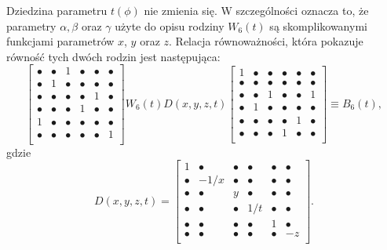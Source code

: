 \documentclass[a4paper,12pt,twoside]{article}
\begin{document}
Dziedzina parametru $t(\phi)$ nie zmienia si\k{e}. W szczeg\'{o}lno\'{s}ci oznacza to, \.{z}e parametry $\alpha, \beta$ oraz $\gamma$ u\.{z}yte do opisu rodziny $W_6(t)$ s\k{a} skomplikowanymi funkcjami parametr\'{o}w $x$, $y$ oraz $z$. Relacja r\'{o}wnowa\.{z}no\'{s}ci, kt\'{o}ra pokazuje r\'{o}wno\'{s}\'{c} tych dw\'{o}ch rodzin jest nast\k{e}puj\k{a}ca:
\begin{equation}
\left[
\begin{array}{cccccc}
\bullet & \bullet &       1 & \bullet & \bullet & \bullet\\
\bullet &       1 & \bullet & \bullet & \bullet & \bullet\\
\bullet & \bullet & \bullet & \bullet &       1 & \bullet\\
\bullet & \bullet & \bullet &       1 & \bullet & \bullet\\
      1 & \bullet & \bullet & \bullet & \bullet & \bullet\\
\bullet & \bullet & \bullet & \bullet & \bullet & 1\\
\end{array}
\right]
W_6(t) D(x,y,z,t)
\left[
\begin{array}{cccccc}
1 & \bullet & \bullet & \bullet & \bullet & \bullet\\
\bullet & \bullet & \bullet & \bullet & \bullet & \bullet\\
\bullet & \bullet &       1 & \bullet & \bullet &       1\\
\bullet &       1 & \bullet & \bullet & \bullet & \bullet\\
\bullet & \bullet & \bullet & \bullet &       1 & \bullet\\
\bullet & \bullet & \bullet &       1 & \bullet & \bullet\\
\end{array}
\right]\equiv B_6(t),
\end{equation}
gdzie
\begin{equation}
D(x,y,z,t)=
\left[
\begin{array}{cccccc}
      1 & \bullet & \bullet & \bullet & \bullet & \bullet\\
\bullet &    -1/x & \bullet & \bullet & \bullet & \bullet\\
\bullet & \bullet &       y & \bullet & \bullet & \bullet\\
\bullet & \bullet & \bullet &     1/t & \bullet & \bullet\\
\bullet & \bullet & \bullet & \bullet &       1 & \bullet\\
\bullet & \bullet & \bullet & \bullet & \bullet &      -z\\
\end{array}
\right].
\end{equation}
\end{document}
